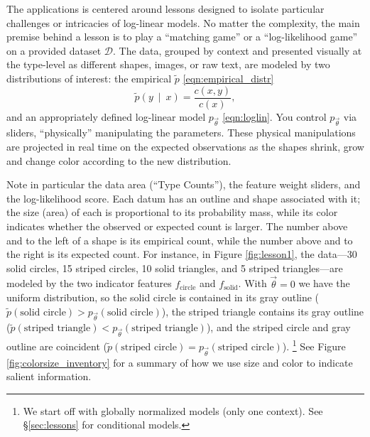 \documentclass[11pt,letterpaper]{article}
\newcommand{\Note}[1]{}
\renewcommand{\Note}[1]{\hl{[#1]}}  %
\newcommand{\NoteSigned}[3]{{\sethlcolor{#2}\Note{#1: #3}}}
\newcommand{\NoteJE}[1]{\NoteSigned{JE}{LightGreen}{#1}}
\newcommand{\Commented}[1]{#1}
\newcommand{\empirical}[0]{\ensuremath{\tilde{p}}}
\newcommand{\Data}[0]{\ensuremath{\mathcal{D}}}
\begin{document}
The applications is centered around lessons designed to isolate particular 
challenges or intricacies of log-linear models. No matter the complexity, the main
premise behind a lesson is to play a ``matching
game'' or a ``log-likelihood game'' on a provided dataset \Data{}. The
data, grouped by context and presented visually at the type-level as
different shapes, images, or raw text, are modeled by two
distributions of interest: the empirical $\tilde{p}$
\eqref{eqn:empirical_distr}
\begin{equation}
\empirical\left(y\ \mid\ x\right) = \frac{c(x,y)}{c(x)},
\label{eqn:empirical_distr}
\end{equation} 
and an appropriately defined log-linear
model $p_{\vec{\theta}}$ \eqref{eqn:loglin}. You control $p_{\vec{\theta}}$ 
via sliders, ``physically'' manipulating the parameters. These physical 
manipulations are projected in real time on the expected observations as the 
shapes shrink, grow and change color according to the new distribution. 


Note in particular the data area (``Type Counts''), the
feature weight sliders, and the log-likelihood score. 
Each datum has an outline and shape associated with it; the size (area) of
each is proportional to its probability mass, while its color
indicates whether the observed or expected count is larger.  The
number above and to the left of a shape is its empirical
count, while the number above and to the right is its expected count.
For instance, in Figure \ref{fig:lesson1}, the data---30 solid
circles, 15 striped circles, 10 solid triangles, and 5 striped
triangles---are modeled by the two indicator features
$f_{\textrm{circle}}$ and $f_{\textrm{solid}}$. With $\vec{\theta} =
0$ we have the uniform distribution, so the solid circle is contained
in its gray outline ($\empirical{}(\textrm{solid circle}) >
p_{\vec{\theta}}(\textrm{solid circle})$), the striped triangle
contains its gray outline ($\empirical{}(\textrm{striped triangle}) <
p_{\vec{\theta}}(\textrm{striped triangle})$), and the striped
circle and gray outline are coincident ($\empirical{}(\textrm{striped
  circle}) = p_{\vec{\theta}}(\textrm{striped circle})$).
\footnote{We start off with globally normalized models (only one 
context). See \S\ref{sec:lessons} for conditional models.}  
See Figure \ref{fig:colorsize_inventory}
for a summary of how we use size and color to indicate salient
information.
\end{document}
